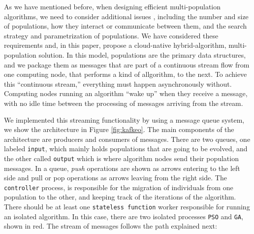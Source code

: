 \documentclass[runningheads]{llncs}
\begin{document}
As we have mentioned before, when designing efficient multi-population
algorithms, we need to consider additional issues \cite{Ma2019},
including the number and size of populations, how they interact or
communicate between them, and the search strategy and parametrization
of populations. We have considered these requirements and, in this
paper, propose a cloud-native hybrid-algorithm, multi-population
solution. In this model, populations are the primary data structures,
and we package them as messages that are part of a continuous stream
flow from one computing node, that performs a kind of allgorithm, to
the next. To achieve this ``continuous stream,'' everything must
happen asynchronously without. Computing nodes running an algorithm
``wake up'' when they receive a message, with no idle time between the
processing of messages arriving from the stream.

We implemented this streaming functionality by using a message
queue system, we show the architecture in Figure
\ref{fig:kafkeo}. The main components of the architecture are 
producers and consumers of messages. There are two queues, one labeled
\texttt{input}, which mainly holds populations that are going to be
evolved, and the other called \texttt{output} which is where algorithm
nodes send their population messages. In a queue, {\em push}
operations are shown as arrows entering to the left side
and pull or pop operations as arrows leaving from the right
side. The \texttt{controller} process, is responsible for the
migration of individuals from one population to the other, and keeping
track of the iterations of the algorithm. There should be at least one
\texttt{stateless function} worker responsible for running an isolated algorithm.
In this case, there are two isolated processes \texttt{PSO} and \texttt{GA},
shown in red. The stream of messages follows the path explained next:
\end{document}
